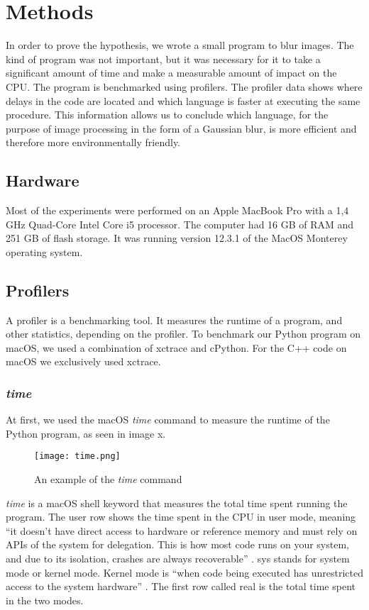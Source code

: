 \chapter{Methods}
In order to prove the hypothesis, we wrote a small program to blur images. The kind of program was not important, but it was necessary for it to take a significant amount of time and make a measurable amount of impact on the CPU.
The program is benchmarked using profilers. The profiler data shows where delays in the code are located and which language is faster at executing the same procedure. This information allows us to conclude which language, for the purpose of image processing in the form of a Gaussian blur, is more efficient and therefore more environmentally friendly.

\section{Hardware}
Most of the experiments were performed on an Apple MacBook Pro with a 1,4 GHz Quad-Core Intel Core i5 processor. The computer had 16 GB of RAM and 251 GB of flash storage. It was running version 12.3.1 of the MacOS Monterey operating system.

\section{Profilers}
A profiler is a benchmarking tool. It measures the runtime of a program, and other statistics, depending on the profiler. To benchmark our Python program on macOS, we used a combination of xctrace and cPython. For the C++ code on macOS we exclusively used xctrace.

\subsection{\textit{time}}
At first, we used the macOS \textit{time} command to measure the runtime of the Python program, as seen in image x.

\begin{figure}[htbp]
	\centering
	\texttt{[image: time.png]}
	\caption{An example of the \textit{time} command}
	\label{figure:time}
\end{figure}

\textit{time} is a macOS shell keyword that measures the total time spent running the program. The user row shows the time spent in the CPU in user mode, meaning “it doesn’t have direct access to hardware or reference memory and must rely on APIs of the system for delegation. This is how most code runs on your system, and due to its isolation, crashes are always recoverable” \cite{time}. sys stands for system mode or kernel mode. Kernel mode is “when code being executed has unrestricted access to the system hardware” \cite{time}. The first row called real is the total time spent in the two modes.

